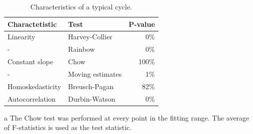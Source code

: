 \documentclass[reprint]{revtex4-1}
\begin{document}
\begin{table}
\centering
\begin{threeparttable}
	\caption{Characteristics of a typical cycle.\label{tbl:CycleChars}}
	\begin{tabular}{llr}
	\hline\hline
	Charactetistic	& Test 					& P-value \\
	\hline
	Linearity 		& Harvey-Collier		& 0\% \\
	-				& Rainbow				& 0\% \\
	Constant slope	& Chow\tnote{a}		 	& 100\% \\
	-				& Moving estimates		& 1\% \\
	Homoskedasticity& Breusch-Pagan 		& 82\% \\
	Autocorrelation & Durbin-Watson			& 0\% \\
	\hline\hline
	\end{tabular}
	\begin{tablenotes}
	\item[a]{The Chow test was performed at every point in the fitting range. The average of F-statistics is used as the test statistic.}
	\end{tablenotes}
\end{threeparttable}
\end{table}
\end{document}
